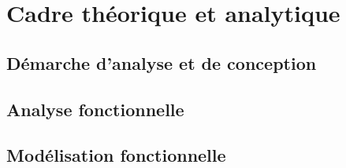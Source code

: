 \chapter{Cadre théorique et analytique}
\label{chap:03-cadre-analytique-conception}
\clearpage


\section{Démarche d'analyse et de conception}
\label{sec:03-demarche-analyse-conception}

\section{Analyse fonctionnelle}
\label{sec:03-analyse-fonctionnelle}

\section{Modélisation fonctionnelle}
\label{sec:03-modelisation-fonctionnelle}

